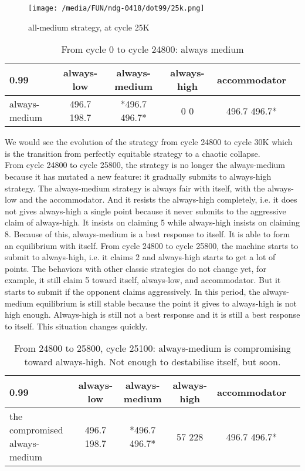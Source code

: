 \documentclass[12.5pt]{report}
\begin{document}
\begin{figure}[h!]
\center
\texttt{[image: /media/FUN/ndg-0418/dot99/25k.png]}
\caption{all-medium strategy, at cycle 25K}
\end{figure}

\begin{table}[h!]
\center
\begin{tabular}{l|ccccc}
\textbf{0.99}& always-low & always-medium & always-high & accommodator\\
\hline
always-medium  &  496.7 198.7 &  *496.7 496.7*   &    0 0   &     496.7 496.7* \\
\end{tabular}
\caption{From cycle 0 to cycle 24800: always medium}
\end{table}

We would see the evolution of the strategy from cycle 24800 to cycle 30K which is the transition from perfectly equitable strategy to a chaotic collapse.\\

From cycle 24800 to cycle 25800, the strategy is no longer the always-medium because it has mutated a new feature: it gradually submits to always-high strategy. The always-medium strategy is always fair with itself, with the always-low and the accommodator. And it resists the always-high completely, i.e. it does not gives always-high a single point because it never submits to the aggressive claim of always-high. It insists on claiming 5 while always-high insists on claiming 8. Because of this, always-medium is a best response to itself. It is able to form an equilibrium with itself. From cycle 24800 to cycle 25800, the machine starts to submit to always-high, i.e. it claims 2 and always-high starts to get a lot of points. The behaviors with other classic strategies do not change yet, for example, it still claim 5 toward itself, always-low, and accommodator. But it starts to submit if the opponent claims aggressively. In this period, the always-medium equilibrium is still stable because the point it gives to always-high is not high enough. Always-high is still not a best response and it is still a best response to itself. This situation changes quickly.

\begin{table}[h!]
\center
\begin{tabular}{l|ccccc}
\textbf{0.99}& always-low & always-medium & always-high & accommodator\\
\hline
the compromised always-medium  &  496.7 198.7 &  *496.7 496.7*   &    57 228   &     496.7 496.7* \\
\end{tabular}
\caption{From 24800 to 25800, cycle 25100: always-medium is compromising toward always-high. Not enough to destabilise itself, but soon.}
\end{table}
\end{document}
